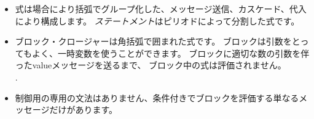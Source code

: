 \documentclass[a4paper,10pt,twoside]{book}
\begin{document}
\begin{itemize}
\item	式は場合により括弧でグループ化した、メッセージ送信、カスケード、代入により構成します。
		\emph{ステートメント}はピリオドによって分割した式です。

\item	ブロック・クロージャーは角括弧で囲まれた式です。
		ブロックは引数をとってもよく、一時変数を使うことができます。
		ブロックに適切な数の引数を伴ったvalueメッセージを送るまで、
		ブロック中の式は評価されません。\\
		.

\item	制御用の専用の文法はありません、条件付きでブロックを評価する単なるメッセージだけがあります。

\end{itemize}

\ifx\wholebook\relax\else
\end{document}
